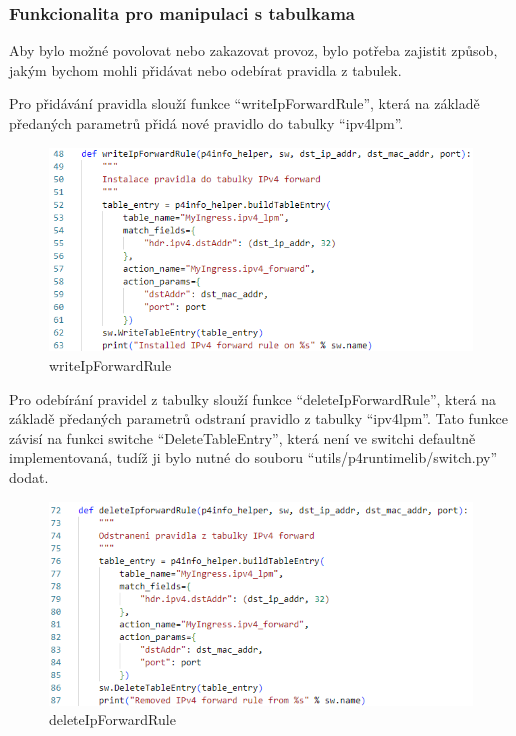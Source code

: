 \documentclass[czech, 11pt]{article}
\begin{document}
    \subsubsection{Funkcionalita pro manipulaci s tabulkama}
    Aby bylo možné povolovat nebo zakazovat provoz, bylo potřeba zajistit způsob, jakým bychom mohli přidávat nebo odebírat pravidla z tabulek.

    Pro přidávání pravidla slouží funkce \enquote{writeIpForwardRule}, která na základě předaných parametrů přidá nové pravidlo do tabulky \enquote{ipv4{\textunderscore}lpm}.

    \begin{figure}[H]
		\centering
		\includegraphics[width=.9\textwidth]{Figures/controller/writeipforwardrule.png}
		\caption{writeIpForwardRule}
		\label{...}
	\end{figure}

    Pro odebírání pravidel z tabulky slouží funkce \enquote{deleteIpForwardRule}, která na základě předaných parametrů odstraní pravidlo z tabulky \enquote{ipv4{\textunderscore}lpm}. Tato funkce závisí na funkci switche \enquote{DeleteTableEntry}, která není ve switchi defaultně implementovaná, tudíž ji bylo nutné do souboru \enquote{utils/p4runtime{\textunderscore}lib/switch.py} dodat.

    \begin{figure}[H]
		\centering
		\includegraphics[width=.9\textwidth]{Figures/controller/deleteipforwardrule.png}
		\caption{deleteIpForwardRule}
		\label{...}
	\end{figure}
\end{document}
